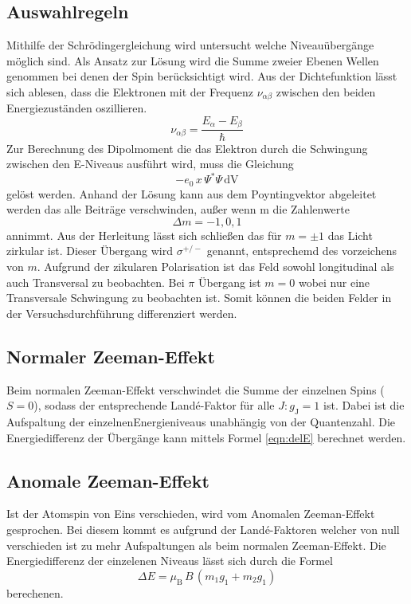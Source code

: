 \subsection{Auswahlregeln}
Mithilfe der Schrödingergleichung wird untersucht welche Niveauübergänge möglich sind. Als Ansatz zur Lösung wird die Summe zweier Ebenen Wellen genommen bei denen der Spin berücksichtigt wird. Aus der Dichtefunktion lässt sich ablesen, dass die Elektronen mit der Frequenz $\nu_{\alpha\beta}$ zwischen den beiden Energiezuständen oszillieren.
\begin{equation}
  \nu_{\alpha\beta}= \frac{E_{\alpha} - E_{\beta}}{\hbar}
  \label{eqn:nu}
\end{equation}
Zur Berechnung des Dipolmoment die das Elektron durch die Schwingung zwischen den E-Niveaus ausführt wird, muss die Gleichung
\begin{equation}
  -e_0\, x \, \Psi^* \Psi \, \text{dV}
  \label{}
\end{equation}
gelöst werden. Anhand der Lösung kann aus dem Poyntingvektor abgeleitet werden das alle Beiträge verschwinden, außer wenn m die Zahlenwerte
\begin{equation}
  \Delta m = -1,0,1
\end{equation}
annimmt. Aus der Herleitung lässt sich schließen das für $m = \pm 1$ das Licht zirkular ist. Dieser Übergang wird $\sigma^{+/-}$ genannt, entsprechemd des vorzeichens von $m$. Aufgrund der zikularen Polarisation ist das Feld sowohl longitudinal als auch Transversal zu beobachten. Bei $\pi$ Übergang ist $m = 0$ wobei nur eine Transversale Schwingung zu beobachten ist. Somit können die beiden Felder in der Versuchsdurchführung differenziert werden.

\subsection{Normaler Zeeman-Effekt}
Beim normalen Zeeman-Effekt verschwindet die Summe der einzelnen Spins ($S=0$), sodass der entsprechende Landé-Faktor für alle $J : g_\text{J} = 1$ ist. Dabei ist die Aufspaltung der einzelnenEnergieniveaus unabhängig von der Quantenzahl. Die Energiedifferenz der Übergänge kann mittels Formel \ref{eqn:delE} berechnet werden.
\subsection{Anomale Zeeman-Effekt}
Ist der Atomspin von Eins verschieden, wird vom Anomalen Zeeman-Effekt gesprochen. Bei diesem kommt es aufgrund der Landé-Faktoren welcher von null verschieden ist zu mehr Aufspaltungen als beim normalen Zeeman-Effekt. Die Energiedifferenz der einzelenen Niveaus lässt sich durch die Formel
\begin{equation}
  \Delta E = \mu_\text{B}\,B\,(m_1 g_1 + m_2 g_1)
  \label{eqn:dE}
\end{equation}
berechenen.

